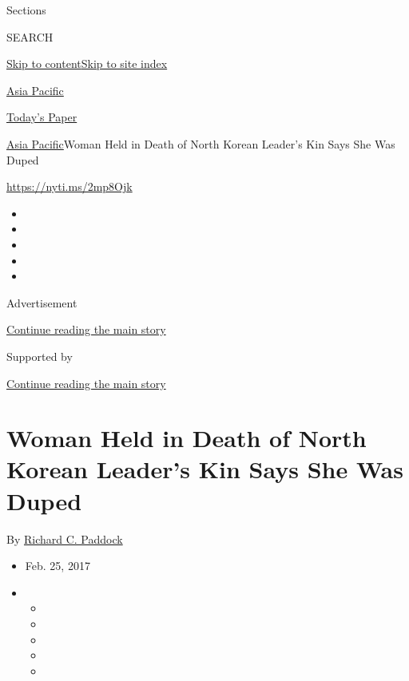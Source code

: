 Sections

SEARCH

\protect\hyperlink{site-content}{Skip to
content}\protect\hyperlink{site-index}{Skip to site index}

\href{https://www.nytimes3xbfgragh.onion/section/world/asia}{Asia
Pacific}

\href{https://myaccount.nytimes3xbfgragh.onion/auth/login?response_type=cookie\&client_id=vi}{}

\href{https://www.nytimes3xbfgragh.onion/section/todayspaper}{Today's
Paper}

\href{/section/world/asia}{Asia Pacific}\textbar{}Woman Held in Death of
North Korean Leader's Kin Says She Was Duped

\url{https://nyti.ms/2mp8Ojk}

\begin{itemize}
\item
\item
\item
\item
\item
\end{itemize}

Advertisement

\protect\hyperlink{after-top}{Continue reading the main story}

Supported by

\protect\hyperlink{after-sponsor}{Continue reading the main story}

\hypertarget{woman-held-in-death-of-north-korean-leaders-kin-says-she-was-duped}{%
\section{Woman Held in Death of North Korean Leader's Kin Says She Was
Duped}\label{woman-held-in-death-of-north-korean-leaders-kin-says-she-was-duped}}

By
\href{https://www.nytimes3xbfgragh.onion/by/richard-c-paddock}{Richard
C. Paddock}

\begin{itemize}
\item
  Feb. 25, 2017
\item
  \begin{itemize}
  \item
  \item
  \item
  \item
  \item
  \end{itemize}
\end{itemize}

